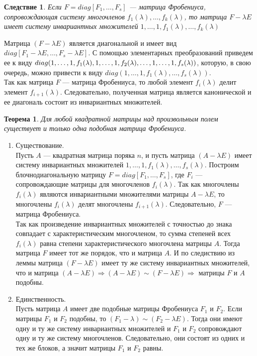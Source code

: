 \newtheorem*{cor12_11_1}{Следствие}\begin{cor12_11_1}Если $F = diag[F_1,\dots,F_s]$ --- матрица Фробениуса, сопровождающая систему многочленов $f_1(\lambda),\dots,f_k(\lambda)$, то матрица $F-\lambda E$ имеет систему инвариантных множителей $1,\dots,1,f_1(\lambda),\dots,f_k(\lambda)$
\end{cor12_11_1}\begin{Proof}
	Матрица $(F-\lambda E)$ является диагональной и имеет вид $diag[F_1-\lambda E,\dots,F_s-\lambda E]$. С помощью элементарных преобразований приведем ее к виду $diag(1,\dots,1,f_1(\lambda),1,\dots,1,f_2(\lambda),\dots,\\ 1,\dots,1,f_s(\lambda))$, которую, в свою очередь, можно привести к виду $diag(1,\dots,1,f_1(\lambda),\dots,f_s(\lambda)).$\\
	Так как матрица $F$ --- матрица Фробениуса, то любой элемент $f_i(\lambda)$ делит элемент $f_{i+1}(\lambda)$. Следовательно, полученная матрица является канонической и ее диагональ состоит из инвариантных множителей.
\end{Proof}
\newtheorem*{th12_11_1}{Теорема}\begin{th12_11_1}Для любой квадратной матрицы над произвольным полем существует и только одна подобная матрица Фробениуса.
\end{th12_11_1}\begin{Proof}\begin{enumerate}
		\item Существование.\\ Пусть $A$ --- квадратная матрица поряка $n$, и пусть матрица $(A-\lambda E)$ имеет систему инвариантных множителей $1,\dots,1,f_1(\lambda),\dots, f_s(\lambda)$. Построим блочнодиагональную матрицу $F = diag[F_1,\dots,F_s]$, где $F_i$ --- сопровождающие матрицы для многочленов $f_i(\lambda)$. Так как многочлены $f_i(\lambda)$ являются инвариантными множителями матрицы $A-\lambda E$, то многочлены $f_i(\lambda)$ делят многочлены $f_{i+1}(\lambda)$. Следовательно, $F$ --- матрица Фробениуса.\\ Так как произведение инвариантных множителей с точностью до знака совпадает с характеристическим многочленом, то сумма степеней всех $f_i(\lambda)$ равна степени характеристического многочлена матрицы $A$. Тогда матрица $F$ имеет тот же порядок, что и матрица $A$. И по следиствию из леммы матрица $(F-\lambda E)$ имеет ту же систему инвариантных множителей, что и матрица $(A-\lambda E)\Rightarrow (A-\lambda E) \sim (F-\lambda E)\Rightarrow$ матрицы $F$ и $A$ подобны.\\
		\item Единственность.\\ Пусть матрица $A$ имеет две подобные матрицы Фробениуса $F_1$ и $F_2$. Если матрицы $F_1$ и $F_2$ подобны, то $(F_1-\lambda) \sim (F_2-\lambda E)$. Тогда они имеют одну и ту же систему инвариантных множителей и $F_1$ и $F_2$ сопровождают одну и ту же систему многочленов. Следовательно, они состоят из одних и тех же блоков, а значит матрицы $F_1$ и $F_2$ равны.
	\end{enumerate}
\end{Proof}\\ 
